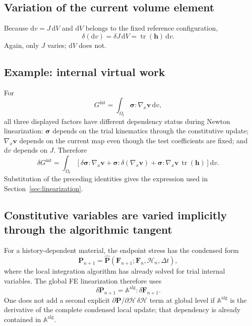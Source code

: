 \documentclass[11pt,a4paper]{article}
\newcommand{\bs}[1]{\boldsymbol{#1}}
\newcommand{\dd}{\mathrm{d}}
\newcommand{\tr}{\operatorname{tr}}
\begin{document}
\subsection{Variation of the current volume element}
Because $\dd v=J\,\dd V$ and $\dd V$ belongs to the fixed reference configuration,
\begin{equation}
\delta(\dd v)=\delta J\,\dd V=\tr(\bs h)\,\dd v.
\end{equation}
Again, only $J$ varies; $\dd V$ does not.

\subsection{Example: internal virtual work}
For
\begin{equation}
G^{\mathrm{int}}=\int_{\Omega_t}\bs\sigma:\nabla_x\bs v\,\dd v,
\end{equation}
all three displayed factors have different dependency status during Newton linearization: $\bs\sigma$ depends on the trial kinematics through the constitutive update; $\nabla_x\bs v$ depends on the current map even though the test coefficients are fixed; and $\dd v$ depends on $J$. Therefore
\begin{equation}
\delta G^{\mathrm{int}}
=
\int_{\Omega_t}
\left[
\delta\bs\sigma:\nabla_x\bs v
+\bs\sigma:\delta(\nabla_x\bs v)
+\bs\sigma:\nabla_x\bs v\,\tr(\bs h)
\right]\dd v.
\end{equation}
Substitution of the preceding identities gives the expression used in Section~\ref{sec:linearization}.

\subsection{Constitutive variables are varied implicitly through the algorithmic tangent}
For a history-dependent material, the endpoint stress has the condensed form
\begin{equation}
\bs P_{n+1}=\widehat{\bs P}(\bs F_{n+1};\bs F_n,\mathcal H_n,\Delta t),
\end{equation}
where the local integration algorithm has already solved for trial internal variables. The global FE linearization therefore uses
\begin{equation}
\delta\bs P_{n+1}=\mathbb A^{\mathrm{alg}}:\delta\bs F_{n+1}.
\end{equation}
One does not add a second explicit $\partial\bs P/\partial\mathcal H\,\delta\mathcal H$ term at global level if $\mathbb A^{\mathrm{alg}}$ is the derivative of the complete condensed local update; that dependency is already contained in $\mathbb A^{\mathrm{alg}}$.
\end{document}
